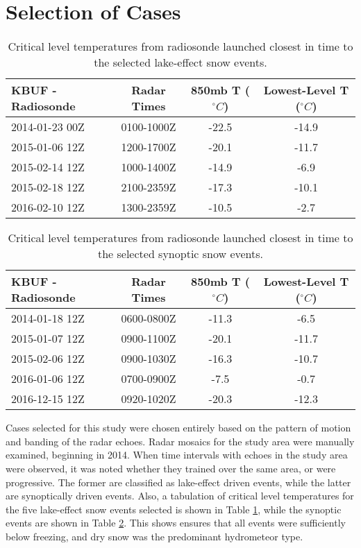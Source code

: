 \section{Selection of Cases}
\begin{table}[h]
    \caption{Critical level temperatures from radiosonde launched closest in time to the selected lake-effect snow events.}\label{eventslake}
    \begin{center}
    \begin{tabular}{|l|c|c|c|}
    \hline
     KBUF - Radiosonde & Radar Times & 850mb T ($^{\circ}C$) & Lowest-Level T ($^{\circ}C$)\\
    \hline\hline
    2014-01-23 00Z & 0100-1000Z & -22.5 & -14.9 \\
    \hline
    2015-01-06 12Z & 1200-1700Z & -20.1 & -11.7 \\
    \hline
    2015-02-14 12Z & 1000-1400Z & -14.9 & -6.9 \\
    \hline
    2015-02-18 12Z & 2100-2359Z & -17.3 & -10.1 \\
    \hline
    2016-02-10 12Z & 1300-2359Z & -10.5 & -2.7 \\
    \hline
    \end{tabular}
    \end{center}
\end{table}
\begin{table}[h]
    \caption{Critical level temperatures from radiosonde launched closest in time to the selected synoptic snow events.}\label{synopticevents}
    \begin{center}
    \begin{tabular}{|l|c|c|c|}
    \hline
     KBUF - Radiosonde & Radar Times & 850mb T ($^{\circ}C$) & Lowest-Level T ($^{\circ}C$)\\
    \hline\hline
    2014-01-18 12Z & 0600-0800Z & -11.3 & -6.5 \\
    \hline
    2015-01-07 12Z & 0900-1100Z & -20.1 & -11.7 \\
    \hline
    2015-02-06 12Z & 0900-1030Z & -16.3 & -10.7 \\
    \hline
    2016-01-06 12Z & 0700-0900Z & -7.5 & -0.7 \\
    \hline
    2016-12-15 12Z & 0920-1020Z & -20.3 & -12.3 \\
    \hline
    \end{tabular}
    \end{center}
\end{table}
Cases selected for this study were chosen entirely based on the pattern of motion and banding of the radar echoes. Radar mosaics for the study area were manually examined, beginning in 2014. When time intervals with echoes in the study area were observed, it was noted whether they trained over the same area, or were progressive. The former are classified as lake-effect driven events, while the latter are synoptically driven events. Also, a tabulation of critical level temperatures for the five lake-effect snow events selected is shown in Table \ref{eventslake}, while the synoptic events are shown in Table \ref{synopticevents}. This shows ensures that all events were sufficiently below freezing, and dry snow was the predominant hydrometeor type.
